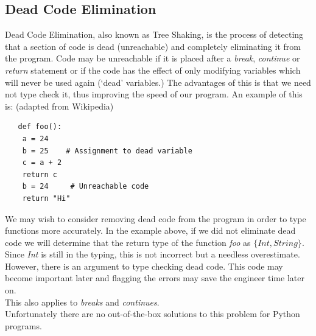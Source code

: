 \documentclass[12pt, titlepage]{article}
\begin{document}
\subsection{Dead Code Elimination}
Dead Code Elimination, also known as Tree Shaking, is the process of detecting that a section of code is dead (unreachable) and completely eliminating it from the program. Code may be unreachable if it is placed after a \textit{break}, \textit{continue} or \textit{return} statement or if the code has the effect of only modifying variables which will never be used again (`dead' variables.) The advantages of this is that we need not type check it, thus improving the speed of our program.
An example of this is: (adapted from Wikipedia)
\begin{lstlisting}
   def foo():
   	a = 24
   	b = 25    # Assignment to dead variable
   	c = a + 2
   	return c
   	b = 24 	   # Unreachable code
   	return "Hi"
\end{lstlisting}
We may wish to consider removing dead code from the program in order to type functions more accurately. In the example above, if we did not eliminate dead code we will determine that the return type of the function \textit{foo} as $\{Int, String\}$. Since \textit{Int} is still in the typing, this is not incorrect but a needless overestimate. However, there is an argument to type checking dead code. This code may become important later and flagging the errors may save the engineer time later on. \\
This also applies to \textit{breaks} and \textit{continues}. \\
Unfortunately there are no out-of-the-box solutions to this problem for Python programs. \\
\end{document}
